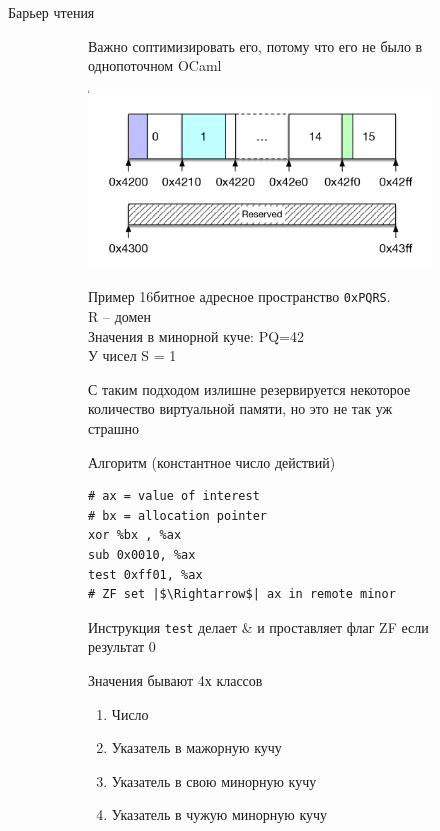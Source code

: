 \documentclass[aspectratio=169
  , xcolor={svgnames} 
  , hyperref={ colorlinks,citecolor=DeepPink4
             , linkcolor=DarkRed,urlcolor=DarkBlue}
  , russian
  ]{beamer}
\theoremstyle{exerciseStyle1}
\begin{document}
\begin{frame}{Барьер чтения}
\begin{figure}[ht]
\begin{subfigure}{.59\textwidth}
Важно соптимизировать его, потому что его не было в однопоточном OCaml

\includegraphics[scale=.35]{img1}
\end{subfigure}
\hspace{.5cm}
\begin{subfigure}{.35\textwidth}
Пример 16битное адресное пространство \texttt{0xPQRS}.\\
R -- домен\\
Значения в минорной куче: PQ=42\\
У чисел S = 1\\ \vspace{0.5cm}

С таким подходом излишне резервируется некоторое количество виртуальной памяти, но это не так уж страшно

\end{subfigure}
\end{figure}
\end{frame}

\begin{frame}[fragile]{}
\begin{figure}[ht]
\begin{subfigure}{.49\textwidth}
Алгоритм (константное число действий)
\begin{verbatim}
# ax = value of interest 
# bx = allocation pointer 
xor %bx , %ax
sub 0x0010, %ax
test 0xff01, %ax
# ZF set |$\Rightarrow$| ax in remote minor 
\end{verbatim}
Инструкция \texttt{test} делает \& и проставляет флаг ZF если результат 0
\end{subfigure}
\begin{subfigure}{.49\textwidth}
Значения бывают 4х классов
\begin{enumerate}
\item Число
\item Указатель в мажорную кучу
\item Указатель в свою минорную кучу
\item Указатель в чужую минорную кучу
\end{enumerate}
\end{subfigure}
\end{figure}
\end{frame}
\end{document}
